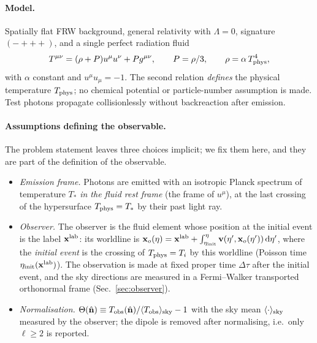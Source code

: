 \paragraph{Model.}
Spatially flat FRW background, general relativity with $\Lambda=0$, signature $(-+++)$, and a
single perfect radiation fluid
\begin{equation}
T^{\mu\nu}=(\rho+P)u^\mu u^\nu+P g^{\mu\nu},\qquad P=\rho/3,\qquad \rho=\alpha\,T_{\rm phys}^4,
\label{eq:fluid}
\end{equation}
with $\alpha$ constant and $u^\mu u_\mu=-1$.  The second relation \emph{defines} the physical
temperature $T_{\rm phys}$; no chemical potential or particle-number assumption is made.  Test photons
propagate collisionlessly without backreaction after emission.

\paragraph{Assumptions defining the observable.}  The problem statement leaves three choices implicit; we fix them here, and
they are part of the definition of the observable.
\begin{itemize}\itemsep1pt
\item[(O1)] \emph{Emission frame.}  Photons are emitted with an isotropic Planck spectrum of temperature $T_*$ \emph{in the
fluid rest frame} (the frame of $u^\mu$), at the last crossing of the hypersurface $T_{\rm phys}=T_*$ by their past light ray.
\item[(O2)] \emph{Observer.}  The observer is the fluid element whose position at the initial event is the label $\mathbf x^{\rm lab}$:
its worldline is $\mathbf x_o(\eta)=\mathbf x^{\rm lab}+\int_{\eta_{\rm init}}^{\eta}\mathbf v(\eta',\mathbf x_o(\eta'))\,\mathrm d\eta'$, where the
\emph{initial event} is the crossing of $T_{\rm phys}=T_i$ by this worldline (Poisson time $\eta_{\rm init}(\mathbf x^{\rm lab})$).  The
observation is made at fixed proper time $\Delta\tau$ after the initial event, and the sky directions are measured in a
Fermi--Walker transported orthonormal frame (Sec.~\ref{sec:observer}).
\item[(O3)] \emph{Normalisation.}  $\Theta(\hat{\mathbf n})\equiv T_{\rm obs}(\hat{\mathbf n})/\langle T_{\rm obs}\rangle_{\rm sky}-1$ with the sky mean $\langle \cdot\rangle_{\rm sky}$ measured by the
observer; the dipole is removed after normalising, i.e.\ only $\ell\ge2$ is reported.
\end{itemize}

